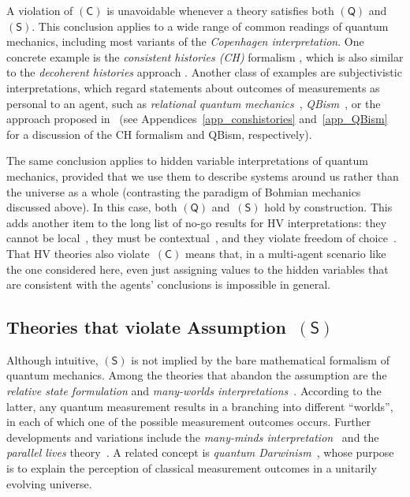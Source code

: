 \documentclass[12pt]{article}
\theoremstyle{mystyle}
\theoremstyle{definition}
\newcommand*{\QT}{\mathsf{(Q)}}
\newcommand*{\SW}{\mathsf{(S)}}
\newcommand*{\SelfCons}{\mathsf{(C)}}
\begin{document}
A violation of $\SelfCons$ is unavoidable whenever a theory  satisfies both $\QT$ and $\SW$. This conclusion applies to a wide range of common readings of quantum mechanics, including most variants of the \emph{Copenhagen interpretation}.  One concrete example is the \emph{consistent histories (CH)} formalism \cite{Griffiths84,Omnes92,Griffiths02}, which is also similar to the \emph{decoherent histories} approach \cite{GelHar90,Hartle11}. Another class of examples are subjectivistic interpretations, which regard statements about outcomes of measurements  as personal to an agent, such as \emph{relational quantum mechanics}~\cite{Rovelli96},  \emph{QBism}~\cite{FucSch13,FuMeSc14}, or  the approach proposed in~\cite{Brukner2017} (see Appendices~\ref{app_conshistories} and~\ref{app_QBism}   for a discussion of the CH formalism and QBism, respectively).
  
The same conclusion applies to hidden variable interpretations of quantum mechanics, provided that we use them to describe systems around us rather than the universe as a whole (contrasting the paradigm of Bohmian mechanics discussed above).  In this case, both $\QT$ and~$\SW$ hold by construction. This adds another item to the long list of no-go results for HV interpretations: they cannot  be local~\cite{Bell66}, they must be contextual~\cite{Bell64,KocSpe67}, and they violate freedom of choice~\cite{ColRen11,ColRen13}. That HV theories also violate~$\SelfCons$ means that, in a multi-agent scenario like the one considered here, even just assigning values to the hidden variables that are consistent with the agents' conclusions is impossible in general.

\smallskip

\subsection{Theories that violate Assumption~$\SW$} \label{sec_Sviolation}

Although intuitive, $\SW$ is not implied by the bare mathematical formalism of quantum mechanics.  Among the theories that abandon the assumption are  the \emph{relative state formulation} and \emph{many-worlds interpretations}~\cite{Everett57,Wheeler57,DeWitt70,Deutsch85,Deutsch97}. According to the latter, any quantum measurement results in a branching into different ``worlds'', in each of which one of the possible measurement outcomes occurs. Further developments and variations include the \emph{many-minds interpretation}~\cite{Zeh70, AlbLoe88} and the \emph{parallel lives} theory~\cite{Brassard13}. A related concept is  \emph{quantum Darwinism}~\cite{Zurek07}, whose purpose is to explain the perception of classical measurement outcomes in a unitarily evolving universe.  
\end{document}
